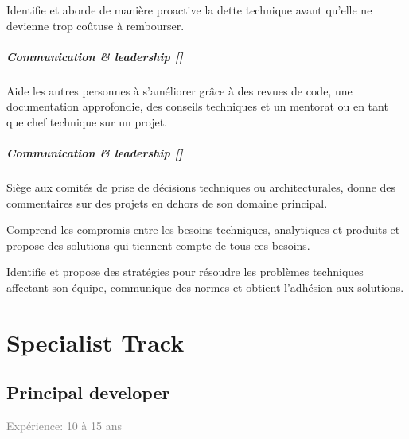 \documentclass[a4paper, french, openany, 12pt]{book}
\newcommand\cha{\textcolor{RawSienna}{\textbf{Communication \& leadership [\bsc{CHA}]}}}
\newcommand\xp[1]{\textcolor{Gray}{Expérience: {#1} ans}}
\begin{document}
\begin{multicols}{2}
  Identifie et aborde de manière proactive la dette technique avant qu'elle ne devienne trop coûtuse à rembourser.

  \subsubsection*{\cha}

  Aide les autres personnes à s'améliorer grâce à des revues de code, une documentation approfondie, des conseils 
  techniques et un mentorat ou en tant que chef technique sur un projet.

  \subsubsection*{\cha}
  Siège aux comités de prise de décisions techniques ou architecturales, donne des commentaires sur des projets en dehors 
  de son domaine principal.

  Comprend les compromis entre les besoins techniques, analytiques et produits et propose des solutions qui tiennent 
  compte de tous ces besoins.

  Identifie et propose des stratégies pour résoudre les problèmes techniques affectant son équipe, communique des normes 
  et obtient l'adhésion aux solutions.

\end{multicols}

\part{Specialist Track}

\chapter{Principal developer}

\xp{10 à 15}
\end{document}
